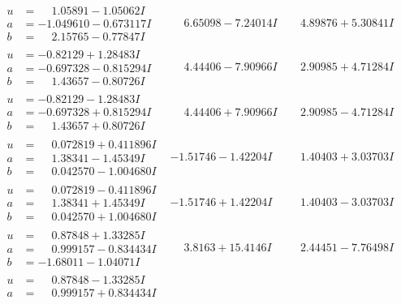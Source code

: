 \documentclass[1p]{elsarticle_modified}
\theoremstyle{definition}
\begin{document}
$$\begin{array}{c|c|c}
\begin{aligned}
u &= \phantom{-}1.05891 - 1.05062 I \\
a &= -1.049610 - 0.673117 I \\
b &= \phantom{-}2.15765 - 0.77847 I\end{aligned}
 & \phantom{-}6.65098 - 7.24014 I & \phantom{-}4.89876 + 5.30841 I \\ \hline\begin{aligned}
u &= -0.82129 + 1.28483 I \\
a &= -0.697328 - 0.815294 I \\
b &= \phantom{-}1.43657 - 0.80726 I\end{aligned}
 & \phantom{-}4.44406 - 7.90966 I & \phantom{-}2.90985 + 4.71284 I \\ \hline\begin{aligned}
u &= -0.82129 - 1.28483 I \\
a &= -0.697328 + 0.815294 I \\
b &= \phantom{-}1.43657 + 0.80726 I\end{aligned}
 & \phantom{-}4.44406 + 7.90966 I & \phantom{-}2.90985 - 4.71284 I \\ \hline\begin{aligned}
u &= \phantom{-}0.072819 + 0.411896 I \\
a &= \phantom{-}1.38341 - 1.45349 I \\
b &= \phantom{-}0.042570 - 1.004680 I\end{aligned}
 & -1.51746 - 1.42204 I & \phantom{-}1.40403 + 3.03703 I \\ \hline\begin{aligned}
u &= \phantom{-}0.072819 - 0.411896 I \\
a &= \phantom{-}1.38341 + 1.45349 I \\
b &= \phantom{-}0.042570 + 1.004680 I\end{aligned}
 & -1.51746 + 1.42204 I & \phantom{-}1.40403 - 3.03703 I \\ \hline\begin{aligned}
u &= \phantom{-}0.87848 + 1.33285 I \\
a &= \phantom{-}0.999157 - 0.834434 I \\
b &= -1.68011 - 1.04071 I\end{aligned}
 & \phantom{-}3.8163 + 15.4146 I & \phantom{-}2.44451 - 7.76498 I \\ \hline\begin{aligned}
u &= \phantom{-}0.87848 - 1.33285 I \\
a &= \phantom{-}0.999157 + 0.834434 I \\

\end{aligned}
\end{array}$$
\end{document}
